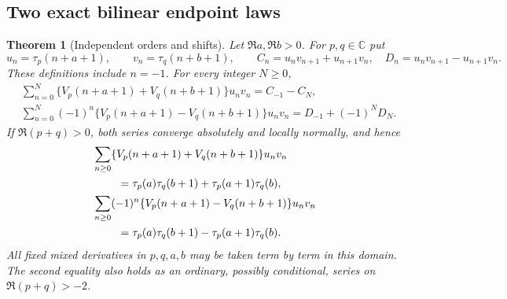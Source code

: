 \documentclass[11pt]{article}
\newtheorem{theorem}{Theorem}[section]
\theoremstyle{definition}
\theoremstyle{remark}
\numberwithin{equation}{section}
\begin{document}
\subsection{Two exact bilinear endpoint laws}

\begin{theorem}[Independent orders and shifts]\label{bil:master}
Let $\Re a,\Re b>0$. For $p,q\in\mathbb C$ put
\[
 u_n=\tau_p(n+a+1),\qquad v_n=\tau_q(n+b+1),\qquad
 C_n=u_nv_{n+1}+u_{n+1}v_n,\quad
 D_n=u_nv_{n+1}-u_{n+1}v_n.
\]
These definitions include $n=-1$. For every integer $N\ge0$,
\begin{align}
 &\sum_{n=0}^{N}
 \{V_p(n+a+1)+V_q(n+b+1)\}u_nv_n
       =C_{-1}-C_N,\label{bil:finite-plus}\\
 &\sum_{n=0}^{N}(-1)^n
 \{V_p(n+a+1)-V_q(n+b+1)\}u_nv_n
       =D_{-1}+(-1)^ND_N.\label{bil:finite-minus}
\end{align}
If $\Re(p+q)>0$, both series converge absolutely and locally normally,
and hence
\begin{align}
 &\sum_{n\ge0}\{V_p(n+a+1)+V_q(n+b+1)\}u_nv_n\notag\\
 &\hspace{8mm}=\tau_p(a)\tau_q(b+1)+\tau_p(a+1)\tau_q(b),
                                      \label{bil:plus}\\
 &\sum_{n\ge0}(-1)^n\{V_p(n+a+1)-V_q(n+b+1)\}u_nv_n\notag\\
 &\hspace{8mm}=\tau_p(a)\tau_q(b+1)-\tau_p(a+1)\tau_q(b).
                                      \label{bil:minus}
\end{align}
All fixed mixed derivatives in $p,q,a,b$ may be taken term by term
in this domain. The second equality also holds as an ordinary,
possibly conditional, series on $\Re(p+q)>-2$.
\end{theorem}
\end{document}
